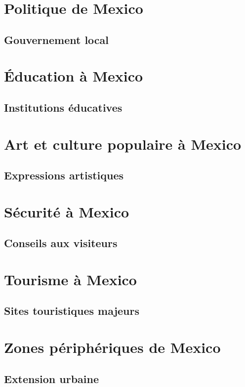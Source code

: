 \documentclass[12pt, a4paper]{article}
\begin{document}
\section{Politique de Mexico}
\subsection{Gouvernement local}
\section{Éducation à Mexico}
\subsection{Institutions éducatives}
\section{Art et culture populaire à Mexico}
\subsection{Expressions artistiques}
\section{Sécurité à Mexico}
\subsection{Conseils aux visiteurs}
\section{Tourisme à Mexico}
\subsection{Sites touristiques majeurs}
\section{Zones périphériques de Mexico}
\subsection{Extension urbaine}
\end{document}
